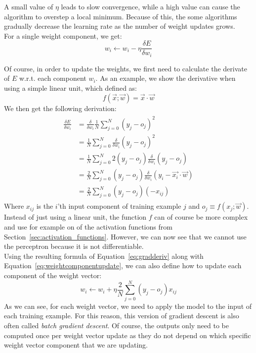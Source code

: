 A small value of $\eta$ leads to slow convergence, while a high value can cause the algorithm to overstep a local minimum. Because of this, the some algorithms gradually decrease the learning rate as the number of weight updates grows.\\
For a single weight component, we get:
\begin{equation}
    \label{eq:weightcomponentupdate}
    w_i \gets w_i - \eta \frac{\delta E}{\delta w_i}
\end{equation}

Of course, in order to update the weights, we first need to calculate the derivate of $E$ w.r.t. each component $w_i$. As an example, we show the derivative when using a simple linear unit, which defined as:
\begin{equation}
    f(\overrightarrow{x};\overrightarrow{w}) = \overrightarrow{x} \cdot \overrightarrow{w}
\end{equation}
We then get the following derivation:
\begin{align}
    \label{eq:gradderiv}
    \begin{split}
        \frac{\delta E}{\delta w_i} &= \frac{\delta}{\delta w_i} \frac{1}{N} \sum_{j=0}^N (y_j - o_j)^2\\
        &= \frac{1}{N} \sum_{j=0}^N \frac{\delta}{\delta w_i} (y_j - o_j)^2\\
        &= \frac{1}{N} \sum_{j=0}^N 2 (y_j - o_j) \frac{\delta}{\delta w_i} (y_j - o_j)\\
        &= \frac{2}{N} \sum_{j=0}^N (y_j - o_j) \frac{\delta}{\delta w_i} (y_i - \overrightarrow{x_i} \cdot \overrightarrow{w})\\
        &= \frac{2}{N} \sum_{j=0}^N (y_j - o_j)(-x_{ij})
    \end{split}
\end{align}
Where $x_{ij}$ is the $i$'th input component of training example $j$ and $o_j \equiv f(x_j; \overrightarrow{w})$. Instead of just using a linear unit, the function $f$ can of course be more complex and use for example on of the activation functions from Section~\ref{sec:activation_functions}. However, we can now see that we cannot use the perceptron because it is not differentiable.\\

Using the resulting formula of Equation~\ref{eq:gradderiv} along with Equation~\ref{eq:weightcomponentupdate}, we can also define how to update each component of the weight vector:
\begin{equation}
    w_i \gets w_i + \eta \frac{2}{N} \sum_{j=0}^N (y_j - o_j)x_{ij}
\end{equation}
As we can see, for each weight vector, we need to apply the model to the input of each training example. For this reason, this version of gradient descent is also often called \textit{batch gradient descent}. Of course, the outputs only need to be computed once per weight vector update as they do not depend on which specific weight vector component that we are updating.\\

